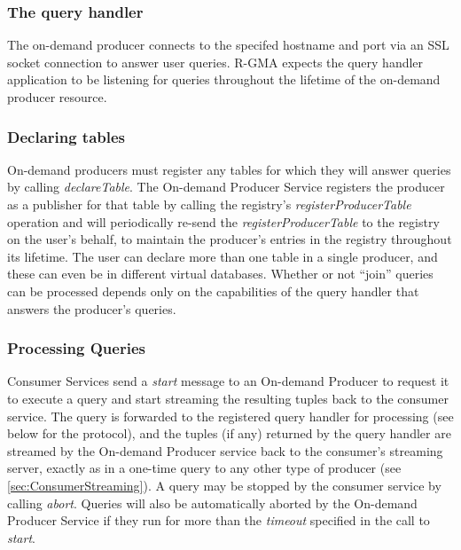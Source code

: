 \subsubsection{The query handler}

The on-demand producer connects to the specifed hostname and port via an SSL
socket connection to answer user queries. R-GMA
expects the query handler application to be listening for queries
throughout the lifetime of the on-demand producer resource.

\subsubsection{Declaring tables}\label{sec:OnDemandProducerDeclaring}

On-demand producers must register any tables for which they will
answer queries by calling \textit{declareTable}. The On-demand
Producer Service registers the producer as a publisher for that table
by calling the registry's \textit{registerProducerTable} operation and
will periodically re-send the \textit{registerProducerTable} to the
registry on the user's behalf, to maintain the producer's entries in
the registry throughout its lifetime. The user can declare more than
one table in a single producer, and these can even be in different
virtual databases. Whether or not ``join'' queries can be processed
depends only on the capabilities of the query handler that answers the
producer's queries.

\subsubsection{Processing Queries}\label{sec:OnDemandProducerQueryProcessing}

Consumer Services send a \textit{start} message to an On-demand
Producer to request it to execute a query and start streaming the
resulting tuples back to the consumer service. The query is forwarded
to the registered query handler for processing (see below for the protocol),
and the tuples (if any)
returned by the query handler are streamed by the On-demand Producer service
back to the consumer's streaming server, exactly as in a one-time query to
any other type of producer (see \ref{sec:ConsumerStreaming}). A query may be
stopped by the consumer service by calling \textit{abort}. Queries
will also be automatically aborted by the On-demand Producer Service
if they run for more than the \textit{timeout} specified in the call
to \textit{start}.

